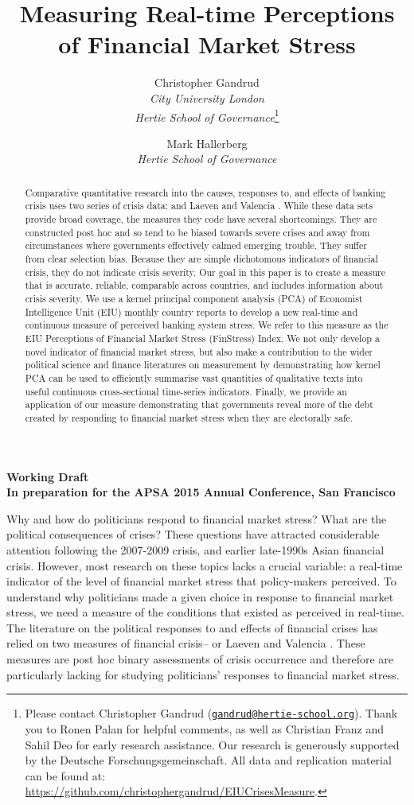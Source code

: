\documentclass[]{article}
\title{Measuring Real-time Perceptions of Financial Market Stress}
\author{Christopher Gandrud \\ \emph{City University London} \\ \emph{Hertie School of Governance}\footnote{Please contact Christopher Gandrud
(\href{mailto:gandrud@hertie-school.org}{\nolinkurl{gandrud@hertie-school.org}}).
Thank you to Ronen Palan for helpful comments, as well as Christian Franz and Sahil Deo for early research assistance. Our research is generously supported by the Deutsche Forschungsgemeinschaft. All data and replication material can be found at:
\url{https://github.com/christophergandrud/EIUCrisesMeasure}.}
\and
Mark Hallerberg \\ \emph{Hertie School of Governance}}
\begin{document}
\maketitle

\begin{center}
    \textbf{Working Draft \\ In preparation for the APSA 2015 Annual Conference, San Francisco}
\end{center}

\begin{abstract}
    Comparative quantitative research into the causes, responses to, and effects of banking crisis uses two series of crisis data: \cite{Reinhart2009,ReinhartRog2010} and Laeven and Valencia \citeyearpar[and their predecessors]{laeven2013}. While these data sets provide broad coverage, the measures they code have several shortcomings. They are constructed post hoc and so tend to be biased towards severe crises and away from circumstances where governments effectively calmed emerging trouble. They suffer from clear selection bias. Because they are simple dichotomous indicators of financial crisis, they do not indicate crisis severity. Our goal in this paper is to create a measure that is accurate, reliable, comparable across countries, and includes information about crisis severity. We use a kernel principal component analysis (PCA) of Economist Intelligence Unit (EIU) monthly country reports to develop a new real-time and continuous measure of perceived banking system stress. We refer to this measure as the EIU Perceptions of Financial Market Stress (FinStress) Index. We not only develop a novel indicator of financial market stress, but also make a contribution to the wider political science and finance literatures on measurement by demonstrating how kernel PCA can be used to efficiently summarise vast quantities of qualitative texts into useful continuous cross-sectional time-series indicators. Finally, we provide an application of our measure demonstrating that governments reveal more of the debt created by responding to financial market stress when they are electorally safe.

\end{abstract}


Why and how do politicians respond to financial market stress? What are the political consequences of crises? These questions have attracted considerable attention following the 2007-2009 crisis, and earlier late-1990s Asian financial crisis. However, most research on these topics lacks a crucial variable: a real-time indicator of the level of financial market stress that policy-makers perceived. To understand why politicians made a given choice in response to financial market stress, we need a measure of the conditions that existed as perceived in real-time. The literature on the political responses to and effects of financial crises has relied on two measures of financial crisis--\cite{Reinhart2009,ReinhartRog2010} or Laeven and Valencia \citeyearpar[and their predecessors]{laeven2013}. These measures are post hoc binary assessments of crisis occurrence and therefore are particularly lacking for studying politicians' responses to financial market stress.
\end{document}
